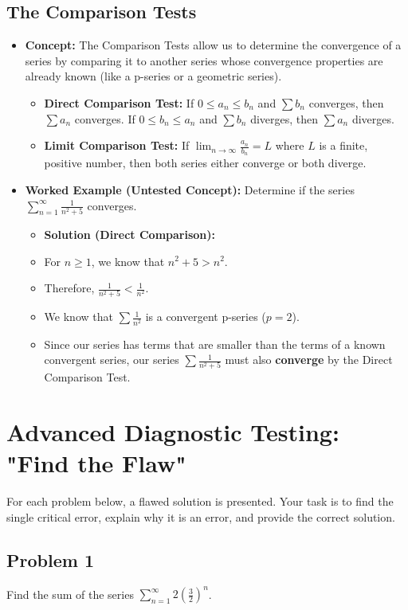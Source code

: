 \documentclass{article}
\begin{document}
\subsection{The Comparison Tests}
\begin{itemize}
    \item \textbf{Concept:} The Comparison Tests allow us to determine the convergence of a series by comparing it to another series whose convergence properties are already known (like a p-series or a geometric series).
    \begin{itemize}
        \item \textbf{Direct Comparison Test:} If $0 \le a_n \le b_n$ and $\sum b_n$ converges, then $\sum a_n$ converges. If $0 \le b_n \le a_n$ and $\sum b_n$ diverges, then $\sum a_n$ diverges.
        \item \textbf{Limit Comparison Test:} If $\lim_{n \to \infty} \frac{a_n}{b_n} = L$ where $L$ is a finite, positive number, then both series either converge or both diverge.
    \end{itemize}
    \item \textbf{Worked Example (Untested Concept):} Determine if the series $\sum_{n=1}^{\infty} \frac{1}{n^2+5}$ converges.
    \begin{itemize}
        \item \textbf{Solution (Direct Comparison):}
            \item For $n \ge 1$, we know that $n^2+5 > n^2$.
            \item Therefore, $\frac{1}{n^2+5} < \frac{1}{n^2}$.
            \item We know that $\sum \frac{1}{n^2}$ is a convergent p-series ($p=2$).
            \item Since our series has terms that are smaller than the terms of a known convergent series, our series $\sum \frac{1}{n^2+5}$ must also \textbf{converge} by the Direct Comparison Test.
    \end{itemize}
\end{itemize}

\section{Advanced Diagnostic Testing: "Find the Flaw"}
For each problem below, a flawed solution is presented. Your task is to find the single critical error, explain why it is an error, and provide the correct solution.

\subsection*{Problem 1}
Find the sum of the series $\sum_{n=1}^{\infty} 2 \left(\frac{3}{2}\right)^n$.
\end{document}
